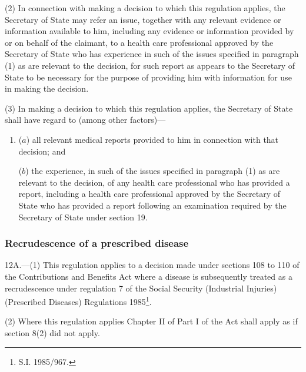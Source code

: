 \documentclass[12pt,a4paper]{article}
\begin{document}
(2) In connection with making a decision to which this regulation applies, the Secretary of State may refer an issue, together with any relevant evidence or information available to him, including any evidence or information provided by or on behalf of the claimant, to a 
health care professional approved by the Secretary of State  %
who has experience in such of the issues specified in paragraph (1) as are relevant to the decision, for such report as appears to the Secretary of State to be necessary for the purpose of providing him with information for use in making the decision.

(3) In making a decision to which this regulation applies, the Secretary of State shall have regard to (among other factors)—
\begin{enumerate}\item[]
($a$) all relevant medical reports provided to him in connection with that decision; and

($b$) the experience, in such of the issues specified in paragraph (1) as are relevant to the decision, of any 
health care professional  %
who has provided a report, including a 
health care professional approved by the Secretary of State  %
who has provided a report following an examination required by the Secretary of State under section 19.
\end{enumerate}


\subsubsection[12A. Recrudescence of a prescribed disease]{Recrudescence of a prescribed disease}

12A.---(1)  This regulation applies to a decision made under sections 108 to 110 of the Contributions and Benefits Act where a disease is subsequently treated as a recrudescence under regulation 7 of the Social Security (Industrial Injuries) (Prescribed Diseases) Regulations 1985\footnote{\frenchspacing S.I. 1985/967.}.

(2) Where this regulation applies Chapter II of Part I of the Act shall apply as if section 8(2) did not apply.
\end{document}
